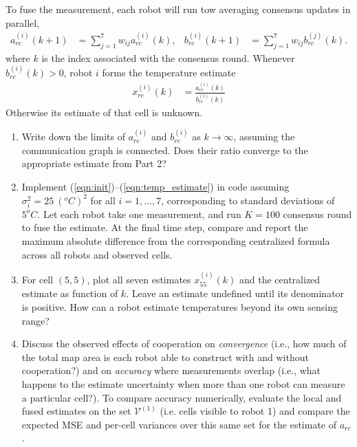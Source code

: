 \documentclass[12pt]{article}
\begin{document}
To fuse the measurement, each robot will run tow averaging consensus updates in parallel,
\begin{align}\label{eqn:consensus}
    a_{rc}^{(i)}(k+1)&=\sum_{j=1}^7w_{ij}a_{rc}^{(i)}(k), & b_{rc}^{(i)}(k+1)&=\sum_{j=1}^7w_{ij}b_{rc}^{(j)}(k).
\end{align}
where $k$ is the index associated with the consensus round. Whenever $b_{rc}^{(i)}(k)>0$, robot $i$ forms the temperature estimate
\begin{align}\label{eqn:temp_estimate}
    x_{rc}^{(i)}(k)&=\frac{a_{rc}^{(i)}(k)}{b_{rc}^{(i)}(k)}
\end{align}
Otherwise its estimate of that cell is unknown.

\begin{enumerate}[label=(\alph*)]
    \item Write down the limits of $a_{rc}^{(i)}$ and $b_{rc}^{(i)}$ as $k\to\infty$, assuming the communication graph is connected. Does their ratio converge to the appropriate estimate from Part 2?
    \item Implement (\ref{eqn:init})--(\ref{eqn:temp_estimate}) in code assuming $\sigma_i^2=25\ (^oC)^2$ for all $i=1,\dots,7$, corresponding to standard deviations of $5^oC$. Let each robot take one measurement, and run $K=100$ consensus round to fuse the estimate. At the final time step, compare and report the maximum absolute difference from the corresponding centralized formula across all robots and observed cells.
    \item For cell $(5,5)$, plot all seven estimates $x_{55}^{(i)}(k)$ and the centralized estimate as function of $k$. Leave an estimate undefined until its denominator is positive. How can a robot estimate temperatures beyond its own sensing range?
    \item Discuss the observed effects of cooperation on \textit{convergence} (i.e., how much of the total map area is each robot able to construct with and without cooperation?) and on \textit{accuracy} where measurements overlap (i.e., what happens to the estimate uncertainty when more than one robot can measure a particular cell?). To compare accuracy numerically, evaluate the local and fused estimates on the set $\mathcal V^{(1)}$ (i.e. cells visible to robot 1) and compare the expected MSE and per-cell variances over this same set for the estimate of $a_{rc}$.
\end{enumerate}
\end{document}
